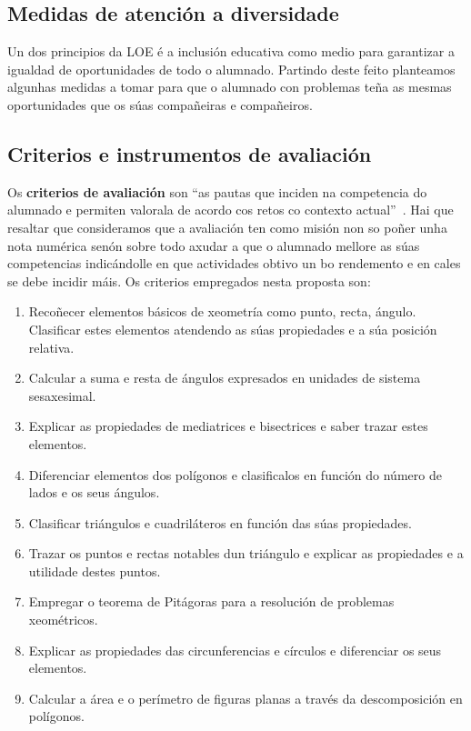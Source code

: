 \subsection{Medidas de atención a diversidade}

Un dos principios da LOE \cite{lomce} é a inclusión educativa como medio para garantizar a igualdad de oportunidades de todo o alumnado. Partindo deste feito planteamos algunhas medidas a tomar para que o alumnado con problemas teña as mesmas oportunidades que os súas compañeiras e compañeiros.


\subsection{Criterios e instrumentos de avaliación}

Os \textbf{criterios de avaliación} son ``as pautas que inciden na competencia do alumnado e permiten valorala de acordo cos retos co contexto actual''~\cite[p. 134]{secdidac}. Hai que resaltar que consideramos que a avaliación ten como misión non so poñer unha nota numérica senón sobre todo axudar a que o alumnado mellore as súas competencias indicándolle en que actividades obtivo un bo rendemento e en cales se debe incidir máis. Os criterios empregados nesta proposta son:

\begin{enumerate}[label=\bfseries Cri\arabic*]
  \item\label{cri1} Recoñecer elementos básicos de xeometría como punto, recta, ángulo. Clasificar estes elementos atendendo as súas propiedades e a súa posición relativa.
  \item\label{cri2} Calcular a suma e resta de ángulos expresados en unidades de sistema sesaxesimal.
  \item\label{cri3} Explicar as propiedades de mediatrices e bisectrices e saber trazar estes elementos.
  \item\label{cri4} Diferenciar elementos dos polígonos e clasificalos en función do número de lados e os seus ángulos.
  \item\label{cri5} Clasificar triángulos e cuadriláteros en función das súas propiedades.
  \item\label{cri6} Trazar os puntos e rectas notables dun triángulo e explicar as propiedades e a utilidade destes puntos.
  \item\label{cri7} Empregar o teorema de Pitágoras para a resolución de problemas xeométricos.
  \item\label{cri8} Explicar as propiedades das circunferencias e círculos e diferenciar os seus elementos.
  \item\label{cri9} Calcular a área e o perímetro de figuras planas a través da descomposición en polígonos.
\end{enumerate}


